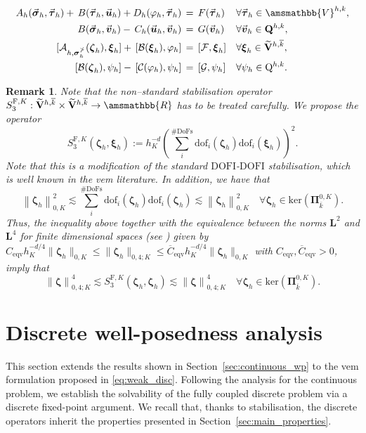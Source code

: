 \documentclass[fleqn,a4paper]{cas-sc}
\newcommand{\norm}[1]{\left\|#1\right\|}
\newcommand{\bbR}{\amsmathbb{R}}
\newcommand\RR{\bbR}
\newcommand{\bu}{\boldsymbol{u}}
\newcommand{\bv}{\boldsymbol{v}}
\newcommand{\bxi}{\boldsymbol{\xi}}
\newcommand{\bzeta}{\boldsymbol{\zeta}}
\newcommand{\bPi}{\boldsymbol{\Pi}}
\newcommand{\0}{\boldsymbol{0}}
\newcommand\cA{\mathcal{A}}
\newcommand\cB{\mathcal{B}}
\newcommand\cC{\mathcal{C}}
\newcommand\cG{\mathcal{G}}
\newcommand\cF{\mathcal{F}}
\newcommand\bQ{\mathbf{Q}}
\newcommand\bV{\mathbf{V}}
\newcommand\rQ{\mathrm{Q}}
\newcommand\bbV{\amsmathbb{V}}
\newcommand\bL{\mathbf{L}}
\newcommand\rF{\mathrm{F}}
\newcommand\bbPi{\mathbb{\Pi}}
\newcommand\bsigma{\boldsymbol{\sigma}}
\newcommand\btau{\boldsymbol{\tau}}
\numberwithin{equation}{section}
\numberwithin{figure}{section}
\newtheorem{remark}{Remark}[section]
\begin{document}
\begin{subequations}\label{eq:weak_disc}
    \begin{align}
        A_h(\vec{\bsigma}_h, \vec{\btau}_h)+\,B(\vec{\btau}_h, \vec{\bu}_h) + D_h(\varphi_h, \vec{\btau}_h) &   \, =\, F(\vec{\btau}_h)  &&\forall \vec{\btau}_h \in \bbV^{h,k},\label{eq:weak_disc1}\\
        B(\vec{\bsigma}_h,  \vec{\bv}_h) -\,C_h(\vec{\bu}_h, \vec{\bv}_h) &  \,=\, G(\vec{\bv}_h)&&\forall \vec{\bv}_h \in \bQ^{h,k}, \label{eq:weak_disc2} \\  
        [\cA_{h,\bsigma_h^\bbPi}(\bzeta_h), \bxi_h]+\,[\cB(\bxi_h), \varphi_h] &   \, =\, [\cF,\bxi_h] && \forall \bxi_h \in \widetilde{\bV}^{h,\overline{k}},\label{eq:weak_disc3}\\
        [\cB(\bzeta_h),  \psi_h]-\,[\cC(\varphi_h), \psi_h] &  \,=\, [\cG,\psi_h] && \forall \psi_h \in \rQ^{h,k}. \label{eq:weak_disc4}
    \end{align}
\end{subequations} 
{\begin{remark}
    Note that the non--standard stabilisation operator $S_3^{\rF,K}:\widetilde{\bV}^{h,\overline{k}}\times \widetilde{\bV}^{h,\overline{k}}\to \RR$ has to be treated carefully. We propose the operator
    $$S_3^{\rF,K}(\bzeta_h,\bxi_h):=h_K^{-d}\left(\sum_{i}^{\mathrm{\#DoFs}} \mathrm{dof}_i(\bzeta_h)\mathrm{dof}_i(\bxi_h)\right)^2.$$
    Note that this is a modification of the standard $\mathrm{DOFI}$-$\mathrm{DOFI}$ stabilisation, which is well known in the \gls{vem} literature. In addition, we have that
    $$\norm{\bzeta_h}_{0,K}^2\lesssim \sum_{i}^{\mathrm{\#DoFs}} \mathrm{dof}_i(\bzeta_h)\mathrm{dof}_i(\bzeta_h) \lesssim\norm{\bzeta_h}_{0,K}^2\quad \forall \bzeta_h\in \mathrm{ker}(\bPi_{\overline{k}}^{0,K}).$$
    Thus, the inequality above together with the equivalence between the norms $\bL^2$ and $\bL^4$ for finite dimensional spaces (see \cite[Lemma 12.1]{ErnGuermond2021FE1}) given by $C_{\mathrm{eqv}}h_K^{-d/4}\|\bzeta_h\|_{0,K} \le \|\bzeta_h\|_{0,4;K}\le \overline{C}_{\mathrm{eqv}}h_K^{-d/4}\|\bzeta_h\|_{0,K}$ with $C_{\mathrm{eqv}},\overline{C}_{\mathrm{eqv}}>0$, imply that
    $$\norm{\bzeta}_{0,4;K}^4\lesssim S_3^{\rF,K}(\bzeta_h,\bzeta_h)\lesssim\norm{\bzeta}_{0,4;K}^4\quad  \forall \bzeta_h\in \mathrm{ker}(\bPi_{\overline{k}}^{0,K}).$$
\end{remark}}
\section{Discrete well-posedness analysis}\label{sec:discrete_wp}
This section extends the results {shown} in Section~\ref{sec:continuous_wp} to the \gls{vem} formulation proposed in \eqref{eq:weak_disc}. Following the analysis for the continuous problem,
we establish the solvability of the fully coupled discrete problem via a discrete fixed-point argument. We recall that, thanks to stabilisation,  the discrete operators inherit the properties presented in Section~\ref{sec:main_properties}.
\end{document}
